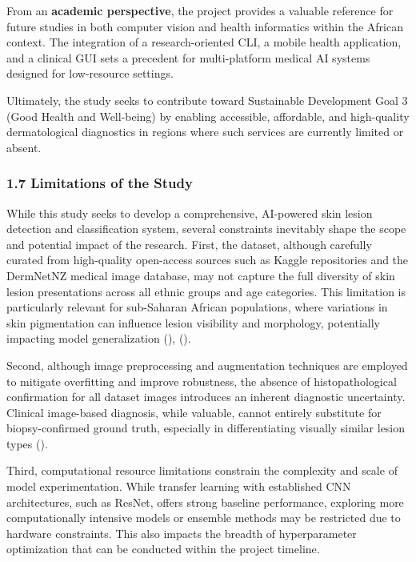 \documentclass[
  12pt,
  oneside]{article}
\begin{document}
From an \textbf{academic perspective}, the project provides a valuable
reference for future studies in both computer vision and health
informatics within the African context. The integration of a
research-oriented CLI, a mobile health application, and a clinical GUI
sets a precedent for multi-platform medical AI systems designed for
low-resource settings.

Ultimately, the study seeks to contribute toward Sustainable Development
Goal 3 (Good Health and Well-being) by enabling accessible, affordable,
and high-quality dermatological diagnostics in regions where such
services are currently limited or absent.

\subsubsection{1.7 Limitations of the
Study}\label{limitations-of-the-study}

While this study seeks to develop a comprehensive, AI-powered skin
lesion detection and classification system, several constraints
inevitably shape the scope and potential impact of the research. First,
the dataset, although carefully curated from high-quality open-access
sources such as Kaggle repositories and the DermNetNZ medical image
database, may not capture the full diversity of skin lesion
presentations across all ethnic groups and age categories. This
limitation is particularly relevant for sub-Saharan African populations,
where variations in skin pigmentation can influence lesion visibility
and morphology, potentially impacting model generalization
(),
().

Second, although image preprocessing and augmentation techniques are
employed to mitigate overfitting and improve robustness, the absence of
histopathological confirmation for all dataset images introduces an
inherent diagnostic uncertainty. Clinical image-based diagnosis, while
valuable, cannot entirely substitute for biopsy-confirmed ground truth,
especially in differentiating visually similar lesion types
().

Third, computational resource limitations constrain the complexity and
scale of model experimentation. While transfer learning with established
CNN architectures, such as ResNet, offers strong baseline performance,
exploring more computationally intensive models or ensemble methods may
be restricted due to hardware constraints. This also impacts the breadth
of hyperparameter optimization that can be conducted within the project
timeline.
\end{document}
